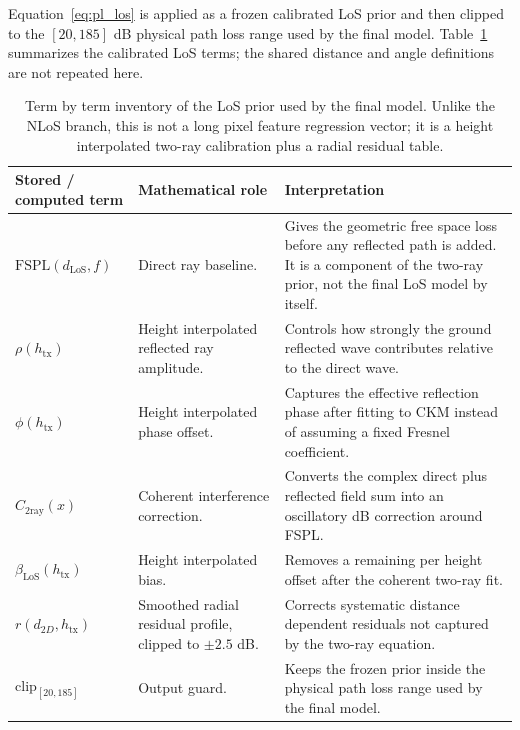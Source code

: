 Equation~\eqref{eq:pl_los} is applied as a frozen calibrated LoS prior and
then clipped to the \([20,185]\) dB physical path loss range used by the final
model. Table~\ref{tab:pl_los_term_inventory} summarizes the calibrated LoS
terms; the shared distance and angle definitions are not repeated here.

\begin{table}[H]
\centering
\caption{Term by term inventory of the LoS prior used by
the final model. Unlike the NLoS branch, this is not a long pixel feature
regression vector; it is a height interpolated two-ray calibration plus a
radial residual table.}
\label{tab:pl_los_term_inventory}
\footnotesize
\setlength{\tabcolsep}{4pt}
\renewcommand{\arraystretch}{1.08}
\begin{tabularx}{\textwidth}{p{3.2cm} X X}
\toprule
\textbf{Stored / computed term} & \textbf{Mathematical role} & \textbf{Interpretation} \\
\midrule
\(\mathrm{FSPL}(d_{\mathrm{LoS}},f)\) & Direct ray baseline. & Gives the geometric free space loss before any reflected path is added. It is a component of the two-ray prior, not the final LoS model by itself. \\
\(\rho(h_{\mathrm{tx}})\) & Height interpolated reflected ray amplitude. & Controls how strongly the ground reflected wave contributes relative to the direct wave. \\
\(\phi(h_{\mathrm{tx}})\) & Height interpolated phase offset. & Captures the effective reflection phase after fitting to CKM instead of assuming a fixed Fresnel coefficient. \\
\(C_{\mathrm{2ray}}(x)\) & Coherent interference correction. & Converts the complex direct plus reflected field sum into an oscillatory dB correction around FSPL. \\
\(\beta_{\mathrm{LoS}}(h_{\mathrm{tx}})\) & Height interpolated bias. & Removes a remaining per height offset after the coherent two-ray fit. \\
\(r(d_{2D},h_{\mathrm{tx}})\) & Smoothed radial residual profile, clipped to \(\pm2.5\) dB. & Corrects systematic distance dependent residuals not captured by the two-ray equation. \\
\(\mathrm{clip}_{[20,185]}\) & Output guard. & Keeps the frozen prior inside the physical path loss range used by the final model. \\
\bottomrule
\end{tabularx}
\end{table}

